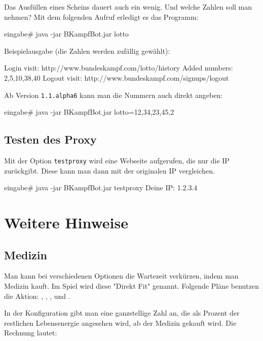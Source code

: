\documentclass{scrartcl}
\begin{document}
Das Ausfüllen eines Scheins dauert auch ein wenig. Und welche Zahlen soll man nehmen? Mit dem folgenden Aufruf erledigt es das Programm:

\begin{code}[emph={lotto}]
eingabe# java -jar BKampfBot.jar lotto
\end{code}

Beispielausgabe (die Zahlen werden zufällig gewählt):

\begin{code}[basicstyle=\tiny\ttfamily]
Login
visit: http://www.bundeskampf.com/lotto/history
Added numbers: 2,5,10,38,40
Logout
visit: http://www.bundeskampf.com/signups/logout
\end{code}

Ab Version \texttt{1.1.alpha6} kann man die Nummern auch direkt angeben:

\begin{code}[emph={lotto}]
eingabe# java -jar BKampfBot.jar lotto=12,34,23,45,2
\end{code}

\subsection{Testen des Proxy}
\label{proxytest}

Mit der Option \texttt{testproxy} wird eine Webseite aufgerufen, die nur die IP
zurückgibt. Diese kann man dann mit der originalen IP vergleichen.

\begin{code}[emph={testproxy}]
eingabe# java -jar BKampfBot.jar testproxy
Deine IP: 1.2.3.4
\end{code}


\section{Weitere Hinweise}
\subsection{Medizin}
\label{Medizin}
Man kann bei verschiedenen Optionen die Wartezeit verkürzen, indem man Medizin kauft. Im Spiel wird diese "Direkt Fit" genannt. Folgende Pläne benutzen die Aktion: , , , \sout{} und .

In der Konfiguration gibt man eine ganzstellige Zahl an, die als Prozent der restlichen Lebensenergie angesehen wird, ab der Medizin gekauft wird. Die Rechnung lautet: 
\end{document}
